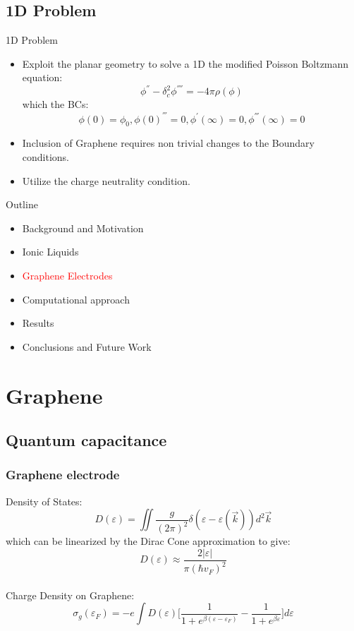 \documentclass{beamer}
\begin{document}
\subsection{1D Problem}
\begin{frame}{1D Problem}
\begin{itemize}
    \item Exploit the planar geometry to solve a 1D the modified Poisson Boltzmann equation:
$$ \phi^{''} - \delta_c^2 \phi^{''''} = -4\pi \rho(\phi)$$
which the BCs:
$$ \phi(0) = \phi_0 , \phi(0)^{'''} = 0 , \phi^{'}(\infty) = 0, \phi^{'''}(\infty) = 0 $$
\item Inclusion of Graphene requires non trivial changes to the Boundary conditions.
\item Utilize the charge neutrality condition.
\end{itemize}{}
\end{frame}


\begin{frame}{Outline}

\begin{itemize}
\item Background and Motivation\\
\item Ionic Liquids\\
\item \textcolor{red}{Graphene Electrodes}\\
\item Computational approach \\
\item Results \\
\item Conclusions and Future Work
\end{itemize}
\end{frame}


\section{Graphene}
\subsection{Quantum capacitance}
\begin{frame}
\frametitle{Graphene electrode}
Density of States:\\
$$D(\varepsilon) = \iint \frac{g}{(2 \pi)^2} \delta(\varepsilon - \varepsilon (\vec{k}))d^2\vec{k} $$
which can be linearized by the Dirac Cone approximation to give:\\
$$D(\varepsilon) \approx \frac{2 |\varepsilon|}{\pi (\hbar v_F)^2}$$\\
Charge Density on Graphene: \\
$$\sigma_g(\varepsilon_F) = -e \int D(\varepsilon) \bigg[ \frac{1}{1+e^{\beta(\varepsilon-\varepsilon_F)}} - \frac{1}{1+e^{\beta \varepsilon}} \bigg] d\varepsilon$$
\end{frame}
 
\end{document}

